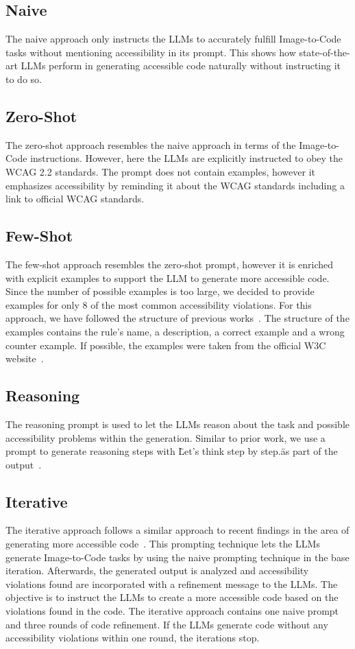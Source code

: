\subsection{Naive}
The naive approach only instructs the LLMs to accurately fulfill Image-to-Code tasks
without mentioning accessibility in its prompt. This shows how state-of-the-art 
LLMs perform in generating accessible code naturally without instructing it to 
do so.

\subsection{Zero-Shot}
The zero-shot approach resembles the naive approach in terms of the Image-to-Code
instructions. However, here the LLMs are explicitly instructed to obey the WCAG 
2.2 standards. The prompt does not contain examples, however it emphasizes 
accessibility by reminding it about the WCAG standards including a link to 
official WCAG standards.

\subsection{Few-Shot}
The few-shot approach resembles the zero-shot prompt, however it is enriched with 
explicit examples to support the LLM to generate more accessible code. 
Since the number of possible examples is too large, we decided to provide examples 
for only 8 of the most common accessibility violations. 
For this approach, we have followed the structure of previous 
works~\parencite{suh2025accessiblecode}.
The structure of the examples contains the rule's name, a description, a
correct example and a wrong counter example. If possible, the examples 
were taken from the official W3C website~\parencite{wcag22}.

\subsection{Reasoning}
The reasoning prompt is used to let the LLMs reason about the task and possible 
accessibility problems within the generation. Similar to prior work, we use 
a prompt to generate reasoning steps with \"Let’s think step by 
step.\" as part of the output~\parencite{chae2024thinkexecute}.

\subsection{Iterative}
The iterative approach follows a similar approach to recent findings in the area
of generating more accessible code~\parencite{suh2025accessiblecode}. This 
prompting technique lets the LLMs generate Image-to-Code tasks by using the naive 
prompting technique in the base iteration. Afterwards, the generated output is 
analyzed and accessibility violations found are incorporated with a refinement 
message to the LLMs. The objective is to instruct the LLMs to create a more 
accessible code based on the violations found in the code. The iterative approach 
contains one naive prompt and three rounds of code refinement. If the LLMs 
generate code without any accessibility violations within one round, the 
iterations stop.


